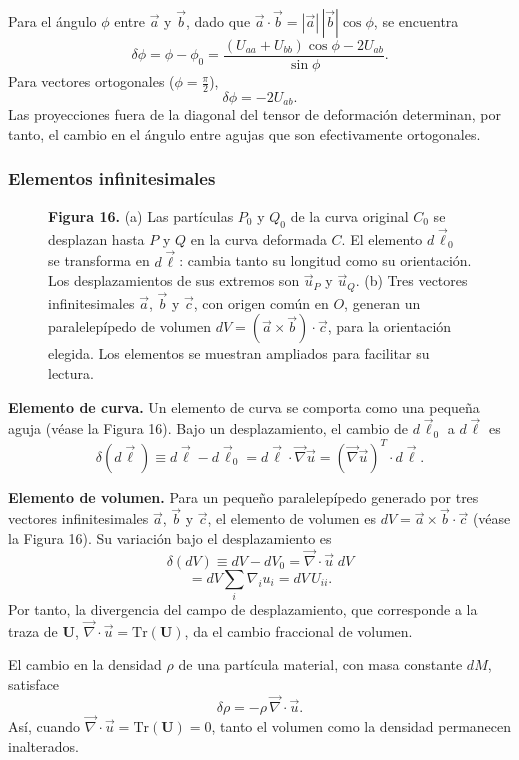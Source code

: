 Para el ángulo $\phi$ entre $\vec{a}$ y $\vec{b}$, dado que $\vec{a}\cdot\vec{b} = |\vec{a}|\,|\vec{b}|\cos\phi$, se encuentra
\[ \delta\phi = \phi - \phi_0 = \frac{(U_{aa} + U_{bb})\cos\phi - 2U_{ab}}{\sin\phi}. \]
Para vectores ortogonales ($\phi = \frac{\pi}{2}$),
\[ \delta\phi = -2U_{ab}. \]
Las proyecciones fuera de la diagonal del tensor de deformación determinan, por tanto, el cambio en el ángulo entre agujas que son efectivamente ortogonales.

\subsubsection{Elementos infinitesimales}

\begin{figure}[H]
\centering

\par\medskip
\textbf{Figura 16.} (a) Las partículas $P_0$ y $Q_0$ de la curva original $C_0$ se desplazan hasta $P$ y $Q$ en la curva deformada $C$. El elemento $d\vec\ell_0$ se transforma en $d\vec\ell$: cambia tanto su longitud como su orientación. Los desplazamientos de sus extremos son $\vec u_P$ y $\vec u_Q$. (b) Tres vectores infinitesimales $\vec a$, $\vec b$ y $\vec c$, con origen común en $O$, generan un paralelepípedo de volumen $dV=(\vec a\times\vec b)\cdot\vec c$, para la orientación elegida. Los elementos se muestran ampliados para facilitar su lectura.
\end{figure}

\textbf{Elemento de curva.} Un elemento de curva se comporta como una pequeña aguja (véase la Figura 16). Bajo un desplazamiento, el cambio de $d\vec{\ell}_0$ a $d\vec{\ell}$ es
\[ \delta(d\vec{\ell}) \equiv d\vec{\ell} - d\vec{\ell}_0 = d\vec{\ell}\cdot\vec{\nabla}\vec{u} = (\vec{\nabla}\vec{u})^{T}\cdot d\vec{\ell}. \]

\textbf{Elemento de volumen.} Para un pequeño paralelepípedo generado por tres vectores infinitesimales $\vec{a}$, $\vec{b}$ y $\vec{c}$, el elemento de volumen es $dV = \vec{a}\times\vec{b}\cdot\vec{c}$ (véase la Figura 16). Su variación bajo el desplazamiento es
\[ \delta(dV) \equiv dV - dV_0 = \vec{\nabla}\cdot\vec{u}\; dV \]
\[ = dV \sum_i \nabla_i u_i = dV\,U_{ii}. \]
Por tanto, la divergencia del campo de desplazamiento, que corresponde a la traza de $\mathbf{U}$, $\vec{\nabla}\cdot\vec{u} = \mathrm{Tr}(\mathbf{U})$, da el cambio fraccional de volumen.

El cambio en la densidad $\rho$ de una partícula material, con masa constante $dM$, satisface
\[ \delta\rho = -\rho\,\vec{\nabla}\cdot\vec{u}. \]
Así, cuando $\vec{\nabla}\cdot\vec{u} = \mathrm{Tr}(\mathbf{U}) = 0$, tanto el volumen como la densidad permanecen inalterados.


